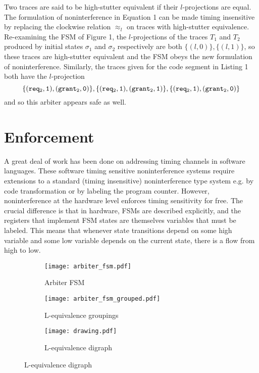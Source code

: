 \documentclass[paper=a4, fontsize=10pt]{scrartcl} %
\begin{document}
Two traces are said to be high-stutter equivalent if their $l$-projections are 
equal. The formulation of noninterference in Equation 1 can be made timing 
insensitive by replacing the clockwise relation $\approx_l$ on traces with 
high-stutter equivalence. Re-examining the FSM of Figure 1, the $l$-projections 
of the traces $T_1$ and $T_2$ produced by initial states $\sigma_1$ and 
$\sigma_2$ respectively are both $\{(l,0)\}, \{(l,1)\}$, so these traces are 
high-stutter equivalent and the FSM obeys the new formulation of 
noninterference. Similarly, the traces given for the code segment in Listing 1 
both have the $l$-projection
$$
\tt
\{(req_2,1),(grant_2,0)\}, \{(req_2,1),(grant_2,1)\}, \{(req_2,1),(grant_2,0)\}
$$
and so this arbiter appears safe as well.

\section{Enforcement}
A great deal of work has been done on addressing timing channels in software 
languages. These software timing sensitive noninterference systems require 
extensions to a standard (timing insensitive) noninterference type system e.g. 
by code transformation or by labeling the program counter. However, 
noninterference at the hardware level enforces timing sensitivity for free. The 
crucial difference is that in hardware, FSMs are described explicitly, and the 
registers that implement FSM states are themselves variables that must be 
labeled. This means that whenever state transitions depend on some high 
variable and some low variable depends on the current state, there is a flow 
from high to low.

\begin{figure}
  \centering
  \begin{subfigure}[b]{0.3\textwidth}
    \texttt{[image: arbiter\_fsm.pdf]}
    \caption{Arbiter FSM}
  \end{subfigure}
  \begin{subfigure}[b]{0.3\textwidth}
    \texttt{[image: arbiter\_fsm\_grouped.pdf]}
    \caption{L-equivalence groupings }
  \end{subfigure}
  \begin{subfigure}[b]{0.3\textwidth}
    \texttt{[image: drawing.pdf]}
    \caption{L-equivalence digraph}
  \end{subfigure}
\end{figure}
\end{document}
